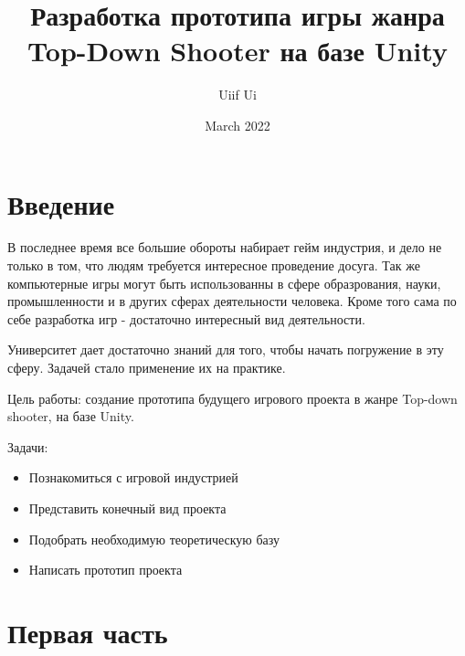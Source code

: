 \documentclass[14pt, titlepage,fleqn,a4paper]{extarticle}
\title{Разработка прототипа игры жанра Top-Down Shooter на базе Unity}
\author{Uiif Ui}
\date{March 2022}
\begin{document}
    \maketitle
	\tableofcontents   
	\setcounter{page}{1}
	\newpage
	\section*{Введение}
	В последнее время все большие обороты набирает гейм индустрия, и дело не только в том, что людям требуется интересное проведение досуга. Так же компьютерные игры могут быть использованны в сфере образрования, науки, промышленности и в других сферах деятельности человека. Кроме того сама по себе разработка игр - достаточно интересный вид деятельности. 
	
	Университет дает достаточно знаний для того, чтобы начать погружение в эту сферу. Задачей стало применение их на практике. 
	
    Цель работы: создание прототипа будущего игрового проекта в жанре Top-down shooter, на базе Unity.
    
    Задачи:
    \begin{itemize}
        \item Познакомиться с игровой индустрией
        \item Представить конечный вид проекта
        \item Подобрать необходимую теоретическую базу
        \item Написать прототип проекта
    \end{itemize}

    \section*{Первая часть}
	
	
\end{document}
